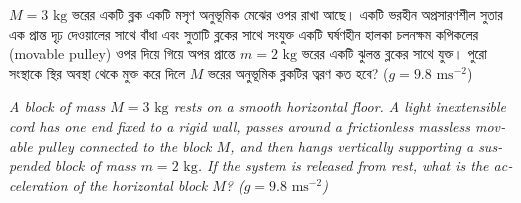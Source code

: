 \documentclass[12pt, a4paper]{article}
\begin{document}
\begin{tcolorbox}[questionbox={প্রশ্ন (Question) 35}]
    \noindent
    $M = 3\text{ kg}$ ভরের একটি ব্লক একটি মসৃণ অনুভূমিক মেঝের ওপর রাখা আছে। একটি ভরহীন অপ্রসারণশীল সুতার এক প্রান্ত দৃঢ় দেওয়ালের সাথে বাঁধা এবং সুতাটি ব্লকের সাথে সংযুক্ত একটি ঘর্ষণহীন হালকা চলনক্ষম কপিকলের (movable pulley) ওপর দিয়ে গিয়ে অপর প্রান্তে $m = 2\text{ kg}$ ভরের একটি ঝুলন্ত ব্লকের সাথে যুক্ত। পুরো সংস্থাকে স্থির অবস্থা থেকে মুক্ত করে দিলে $M$ ভরের অনুভূমিক ব্লকটির ত্বরণ কত হবে? ($g = 9.8\text{ ms}^{-2}$)
    
    \vspace{0.8em}
    \begin{english}
    \noindent\textit{\color{darkgray}
    A block of mass $M = 3\text{ kg}$ rests on a smooth horizontal floor. A light inextensible cord has one end fixed to a rigid wall, passes around a frictionless massless movable pulley connected to the block $M$, and then hangs vertically supporting a suspended block of mass $m = 2\text{ kg}$. If the system is released from rest, what is the acceleration of the horizontal block $M$? ($g = 9.8\text{ ms}^{-2}$)
    }
    \end{english}
\end{tcolorbox}
\end{document}
